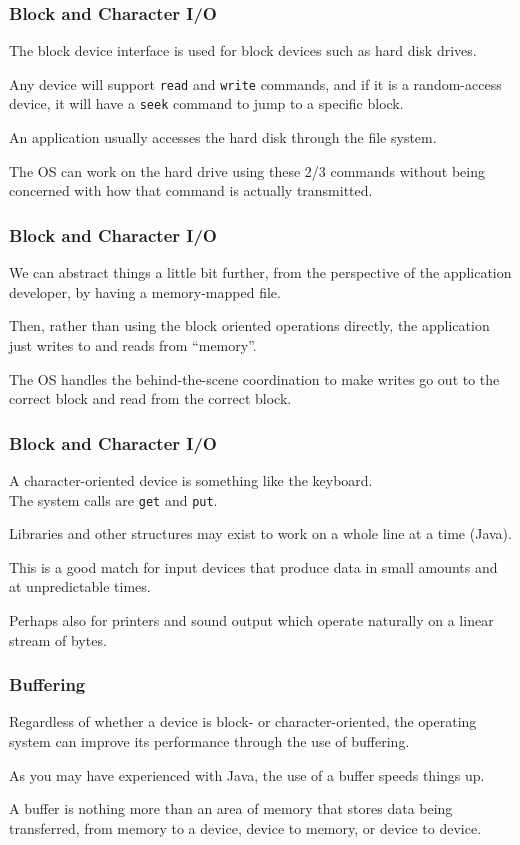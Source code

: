 \begin{frame}
\frametitle{Block and Character I/O}

The block device interface is used for block devices such as hard disk drives. 

Any device will support \texttt{read} and \texttt{write} commands, and if it is a random-access device, it will have a \texttt{seek} command to jump to a specific block. 

An application usually accesses the hard disk through the file system.

The OS can work on the hard drive using these 2/3 commands without being concerned with how that command is actually transmitted.

\end{frame}


\begin{frame}
\frametitle{Block and Character I/O}

We can abstract things a little bit further, from the perspective of the application developer, by having a memory-mapped file. 

Then, rather than using the block oriented operations directly, the application just writes to and reads from ``memory''.

The OS handles the behind-the-scene coordination to make writes go out to the correct block and read from the correct block.


\end{frame}

\begin{frame}
\frametitle{Block and Character I/O}

A character-oriented device is something like the keyboard.\\
\quad The system calls are \texttt{get} and \texttt{put}. 

Libraries and other structures may exist to work on a whole line at a time (Java). 

This is a good match for input devices that produce data in small amounts and at unpredictable times. 

Perhaps also for printers and sound output which operate naturally on a linear stream of bytes.

\end{frame}

\begin{frame}
\frametitle{Buffering}

Regardless of whether a device is block- or character-oriented, the operating system can improve its performance through the use of buffering. 

As you may have experienced with Java, the use of a buffer speeds things up.

A buffer is nothing more than an area of memory that stores data being transferred, from memory to a device, device to memory, or device to device. 

\end{frame}

